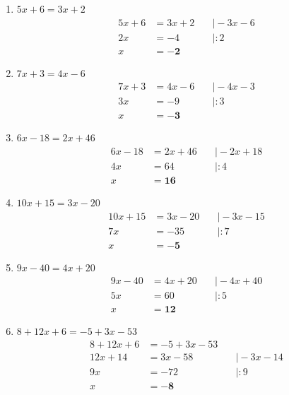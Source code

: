 \documentclass[a4paper,10pt]{article} %
\begin{document}
\begin{enumerate}[label=\alph*)]

  \item \(5x + 6 = 3x + 2\)
  \[
    \begin{aligned}
      5x + 6 &= 3x + 2 &\quad\big| - 3x - 6 \\
      2x &= -4 &\quad\big| : 2 \\
      x &= \mathbf{-2}
    \end{aligned}
  \]

  \item \(7x + 3 = 4x - 6\)
  \[
    \begin{aligned}
      7x + 3 &= 4x - 6 &\quad\big| - 4x - 3 \\
      3x &= -9 &\quad\big| : 3 \\
      x &= \mathbf{-3}
    \end{aligned}
  \]

  \item \(6x - 18 = 2x + 46\)
  \[
    \begin{aligned}
      6x - 18 &= 2x + 46 &\quad\big| - 2x + 18 \\
      4x &= 64 &\quad\big| : 4 \\
      x &= \mathbf{16}
    \end{aligned}
  \]

  \item \(10x + 15 = 3x - 20\)
  \[
    \begin{aligned}
      10x + 15 &= 3x - 20 &\quad\big| - 3x - 15 \\
      7x &= -35 &\quad\big| : 7 \\
      x &= \mathbf{-5}
    \end{aligned}
  \]

  \item \(9x - 40 = 4x + 20\)
  \[
    \begin{aligned}
      9x - 40 &= 4x + 20 &\quad\big| - 4x + 40 \\
      5x &= 60 &\quad\big| : 5 \\
      x &= \mathbf{12}
    \end{aligned}
  \]

  \item \(8 + 12x + 6 = -5 + 3x - 53\)
  \[
    \begin{aligned}
      8 + 12x + 6 &= -5 + 3x - 53 \\
      12x + 14 &= 3x - 58 &\quad\big| - 3x - 14 \\
      9x &= -72 &\quad\big| : 9 \\
      x &= \mathbf{-8}
    \end{aligned}
  \]


\end{enumerate}
\end{document}

